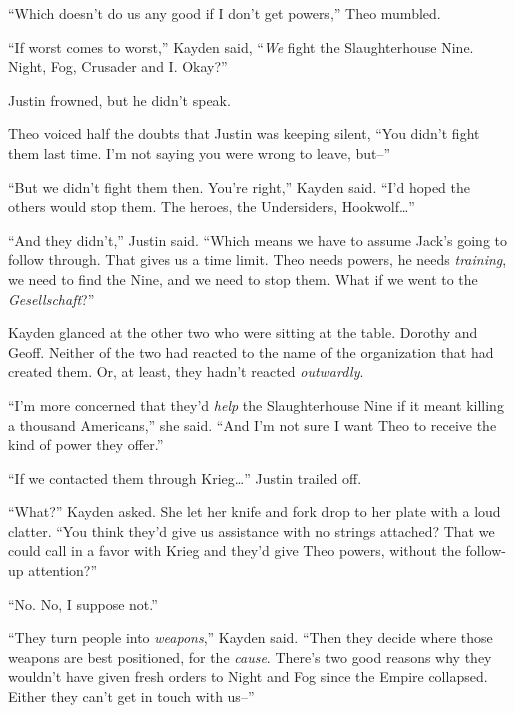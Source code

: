 ``Which doesn't do us any good if I don't get powers,'' Theo mumbled.



``If worst comes to worst,'' Kayden said, ``\emph{We} fight the Slaughterhouse Nine.  Night, Fog, Crusader and I.  Okay?''



Justin frowned, but he didn't speak.



Theo voiced half the doubts that Justin was keeping silent, ``You didn't fight them last time.  I'm not saying you were wrong to leave, but--''



``But we didn't fight them then.  You're right,'' Kayden said.  ``I'd hoped the others would stop them.  The heroes, the Undersiders, Hookwolf\ldots''



``And they didn't,'' Justin said.  ``Which means we have to assume Jack's going to follow through.  That gives us a time limit.  Theo needs powers, he needs \emph{training}, we need to find the Nine, and we need to stop them.  What if we went to the \emph{Gesellschaft}?''



Kayden glanced at the other two who were sitting at the table.  Dorothy and Geoff.  Neither of the two had reacted to the name of the organization that had created them.  Or, at least, they hadn't reacted \emph{outwardly}.



``I'm more concerned that they'd \emph{help} the Slaughterhouse Nine if it meant killing a thousand Americans,'' she said.  ``And I'm not sure I want Theo to receive the kind of power they offer.''



``If we contacted them through Krieg\ldots''  Justin trailed off.



``What?'' Kayden asked.  She let her knife and fork drop to her plate with a loud clatter.  ``You think they'd give us assistance with no strings attached?  That we could call in a favor with Krieg and they'd give Theo powers, without the follow-up attention?''



``No.  No, I suppose not.''



``They turn people into\emph{ weapons},'' Kayden said.  ``Then they decide where those weapons are best positioned, for the \emph{cause}.  There's two good reasons why they wouldn't have given fresh orders to Night and Fog since the Empire collapsed.  Either they can't get in touch with us--''



